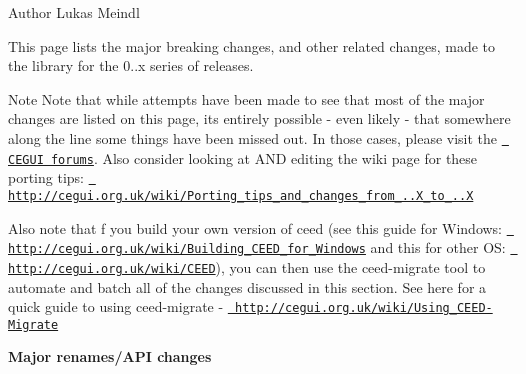 \begin{DoxyAuthor}{Author}
Lukas Meindl
\end{DoxyAuthor}
This page lists the major breaking changes, and other related changes, made to the library for the 0..\+x series of releases.

\begin{DoxyNote}{Note}
Note that while attempts have been made to see that most of the major changes are listed on this page, it\textquotesingle{}s entirely possible -\/ even likely -\/ that somewhere along the line some things have been missed out. In those cases, please visit the \href{http://forums.cegui.org.uk/}{\texttt{ C\+E\+G\+UI forums}}. Also consider looking at A\+ND editing the wiki page for these porting tips\+: \href{http://cegui.org.uk/wiki/Porting_tips_and_changes_from_0.7.X_to_0.8.X}{\texttt{ http\+://cegui.\+org.\+uk/wiki/\+Porting\+\_\+tips\+\_\+and\+\_\+changes\+\_\+from\+\_..\+X\+\_\+to\+\_..\+X}}

Also note that f you build your own version of ceed (see this guide for Windows\+: \href{http://cegui.org.uk/wiki/Building_CEED_for_Windows}{\texttt{ http\+://cegui.\+org.\+uk/wiki/\+Building\+\_\+\+C\+E\+E\+D\+\_\+for\+\_\+\+Windows}} and this for other OS\+: \href{http://cegui.org.uk/wiki/CEED}{\texttt{ http\+://cegui.\+org.\+uk/wiki/\+C\+E\+ED}}), you can then use the ceed-\/migrate tool to automate and batch all of the changes discussed in this section. See here for a quick guide to using ceed-\/migrate -\/ \href{http://cegui.org.uk/wiki/Using_CEED-Migrate}{\texttt{ http\+://cegui.\+org.\+uk/wiki/\+Using\+\_\+\+C\+E\+E\+D-\/\+Migrate}}
\end{DoxyNote}
{\bfseries{ Major renames/\+A\+PI changes }}
